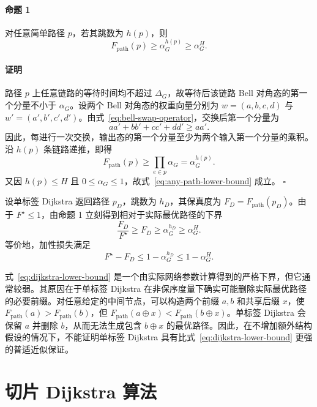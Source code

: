 \paragraph{命题 1}
对任意简单路径 $p$，若其跳数为 $h(p)$，则
\begin{equation}
  F_{\mathrm{path}}(p)
  \ge
  \alpha_G^{h(p)}
  \ge
  \alpha_G^{H}.
  \label{eq:any-path-lower-bound}
\end{equation}

\paragraph{证明}
路径 $p$ 上任意链路的等待时间均不超过 $\Delta_G$，故等待后该链路 Bell 对角态的第一个分量不小于 $\alpha_G$。设两个 Bell 对角态的权重向量分别为 $w=(a,b,c,d)$ 与 $w'=(a',b',c',d')$。由式~\eqref{eq:bell-swap-operator}，交换后第一个分量为
\[
aa' + bb' + cc' + dd'
\ge aa'.
\]
因此，每进行一次交换，输出态的第一个分量至少为两个输入第一个分量的乘积。沿 $h(p)$ 条链路递推，即得
\[
F_{\mathrm{path}}(p)\ge \prod_{e\in p}\alpha_G=\alpha_G^{h(p)}.
\]
又因 $h(p)\le H$ 且 $0\le\alpha_G\le 1$，故式~\eqref{eq:any-path-lower-bound} 成立。 \(\square\)

设单标签 Dijkstra 返回路径 $p_D$，跳数为 $h_D$，其保真度为 $F_D=F_{\mathrm{path}}(p_D)$。由于 $F^\star\le 1$，由命题 1 立刻得到相对于实际最优路径的下界
\begin{equation}
  \frac{F_D}{F^\star}
  \ge
  F_D
  \ge
  \alpha_G^{h_D}
  \ge
  \alpha_G^H.
  \label{eq:dijkstra-lower-bound}
\end{equation}
等价地，加性损失满足
\begin{equation}
  F^\star - F_D
  \le
  1-\alpha_G^{h_D}
  \le
  1-\alpha_G^H.
  \label{eq:dijkstra-additive-bound}
\end{equation}

式~\eqref{eq:dijkstra-lower-bound} 是一个由实际网络参数计算得到的严格下界，但它通常较弱。其原因在于单标签 Dijkstra 在非保序度量下确实可能删除实际最优路径的必要前缀。对任意给定的中间节点，可以构造两个前缀 $a,b$ 和共享后缀 $x$，使 $F_{\mathrm{path}}(a)>F_{\mathrm{path}}(b)$，但 $F_{\mathrm{path}}(a\oplus x)<F_{\mathrm{path}}(b\oplus x)$。单标签 Dijkstra 会保留 $a$ 并删除 $b$，从而无法生成包含 $b\oplus x$ 的最优路径。因此，在不增加额外结构假设的情况下，不能证明单标签 Dijkstra 具有比式~\eqref{eq:dijkstra-lower-bound} 更强的普适近似保证。

\section{切片 Dijkstra 算法}
\label{sec:sliced-dijkstra}


